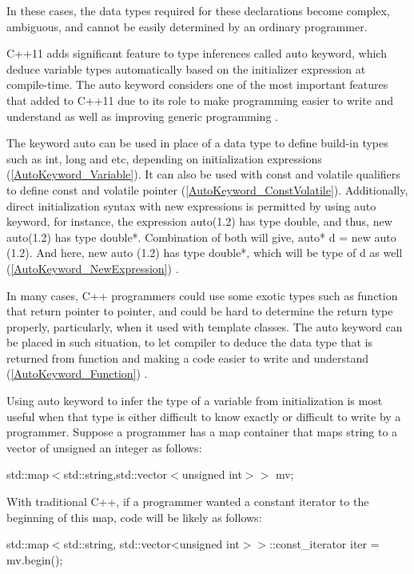 \documentclass[11pt]{report}
\begin{document}
In these cases, the data types required for these declarations become complex, ambiguous, and cannot be easily determined by an ordinary programmer.


C++11 adds significant feature to type inferences called auto keyword, which deduce variable types automatically based on the initializer expression at compile-time.  The auto keyword considers one of the most important features that added to C++11 due to its role to make programming easier to write and understand as well as improving generic programming \cite{Gregorie:professionalcpp}.


The keyword auto can be used in place of a data type to define build-in types such as int, long and etc, depending on initialization expressions (\ref{AutoKeyword_Variable}). It can also be used with const and volatile qualifiers to define const and volatile pointer (\ref{AutoKeyword_ConstVolatile}). Additionally, direct initialization syntax with new expressions is permitted by using auto keyword, for instance, the expression auto(1.2) has type double, and thus, new auto(1.2) has type double*. Combination of both will give, auto* d = new auto (1.2). And here, new auto (1.2) has type double*, which will be type of d as well (\ref{AutoKeyword_NewExpression}) \cite{Stroustrup:2012:Cpp11}.

In many cases, C++ programmers could use some exotic types such as function that return pointer to pointer, and could be hard to determine the return type properly, particularly, when it used with template classes. The auto keyword can be placed in such situation, to let compiler to deduce the data type that is returned from function and making a code easier to write and understand (\ref{AutoKeyword_Function}) \cite{Overland:2011:CWF}.


Using auto keyword to infer the type of a variable from initialization is most useful when that type is either difficult to know exactly or difficult to write by a programmer. Suppose a programmer has a map container that maps string to a vector of unsigned an integer as follows: 

\begin{center}
std::map$<$std::string,std::vector$<$unsigned int$>>$ mv;
\end{center}

With traditional C++, if a programmer wanted a constant iterator to the beginning of this map, code will be likely as follows:

\begin{center}
std::map$<$std::string, std::vector<unsigned int$>>$::const\_iterator iter = mv.begin();
\end{center}
\end{document}
